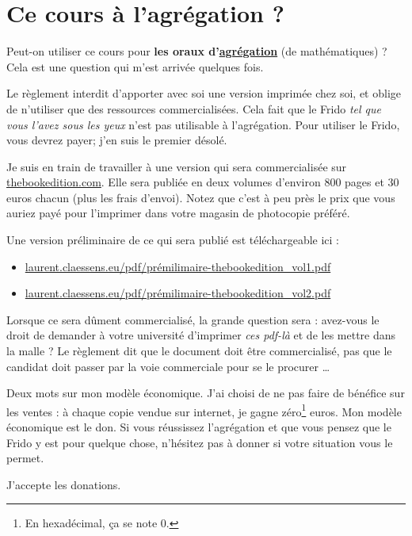 
\section*{Ce cours à l'agrégation ?}

Peut-on utiliser ce cours pour \textbf{les oraux d'\href{http://agreg.org/}{agrégation}} (de mathématiques) ?  Cela est une question qui m'est arrivée quelques fois.  

Le règlement interdit d'apporter avec soi une version imprimée chez soi, et oblige de n'utiliser que des ressources commercialisées. Cela fait que le Frido \emph{tel que vous l'avez sous les yeux} n'est pas utilisable à l'agrégation. Pour utiliser le Frido, vous devrez payer; j'en suis le premier désolé.

Je suis en train de travailler à une version qui sera commercialisée sur \href{http://www.thebookedition.com/fr/}{thebookedition.com}. Elle sera publiée en deux volumes d'environ \( 800\) pages et \( 30\) euros chacun (plus les frais d'envoi). Notez que c'est à peu près le prix que vous auriez payé pour l'imprimer dans votre magasin de photocopie préféré.

Une version préliminaire de ce qui sera publié est téléchargeable ici :
\begin{itemize}
    \item \url{laurent.claessens.eu/pdf/prémilimaire-thebookedition_vol1.pdf}
    \item \url{laurent.claessens.eu/pdf/prémilimaire-thebookedition_vol2.pdf}
\end{itemize}
Lorsque ce sera dûment commercialisé, la grande question sera : avez-vous le droit de demander à votre université d'imprimer \emph{ces pdf-là} et de les mettre dans la malle ? Le règlement dit que le document doit être commercialisé, pas que le candidat doit passer par la voie commerciale pour se le procurer \ldots

Deux mots sur mon modèle économique. J'ai choisi de ne pas faire de bénéfice sur les ventes : à chaque copie vendue sur internet, je gagne zéro\footnote{En hexadécimal, ça se note \( 0\).} euros. Mon modèle économique est le don. Si vous réussissez l'agrégation et que vous pensez que le Frido y est pour quelque chose, n'hésitez pas à donner si votre situation vous le permet.

\vfill

J'accepte les donations.

